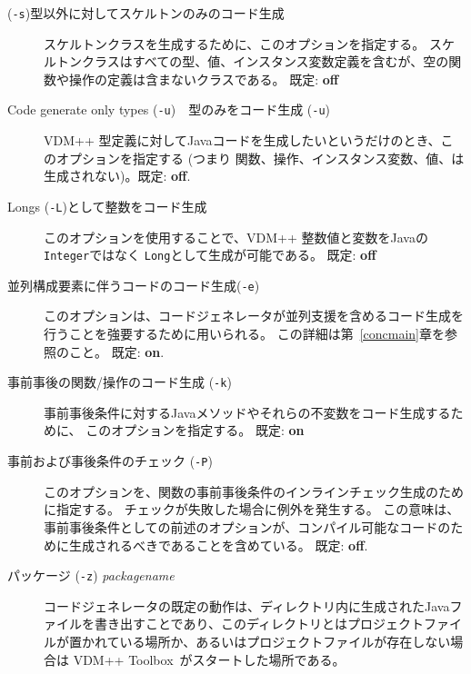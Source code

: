 \documentclass[\pformat,11pt]{jarticle}
\newcommand{\ToolboxName}{VDM++ Toolbox}
\begin{document}
\begin{description}
\item [ ({\tt -s})型以外に対してスケルトンのみのコード生成]
  スケルトンクラスを生成するために、このオプションを指定する。
スケルトンクラスはすべての型、値、インスタンス変数定義を含むが、空の関数や操作の定義は含まないクラスである。
既定: \textbf{off}
\item [Code generate only types ({\tt -u})　型のみをコード生成 ({\tt -u})]
  VDM++ 型定義に対してJavaコードを生成したいというだけのとき、このオプションを指定する (つまり 関数、操作、インスタンス変数、値、は生成されない)。既定: \textbf{off}.%
\item [Longs (\texttt{-L})として整数をコード生成]
  このオプションを使用することで、VDM++ 整数値と変数をJavaの\texttt{Integer}ではなく \texttt{Long}として生成が可能である。
既定: \textbf{off}
\item [並列構成要素に伴うコードのコード生成(\texttt{-e})]
  このオプションは、コードジェネレータが並列支援を含めるコード生成を行うことを強要するために用いられる。
この詳細は第~\ref{concmain}章を参照のこと。
既定: \textbf{on}.
\item [事前事後の関数/操作のコード生成 (\texttt{-k})]
事前事後条件に対するJavaメソッドやそれらの不変数をコード生成するために、 このオプションを指定する。
既定: \textbf{on}%
\item [事前および事後条件のチェック (\texttt{-P})]
 このオプションを、関数の事前事後条件のインラインチェック生成のために指定する。
チェックが失敗した場合に例外を発生する。
この意味は、事前事後条件としての前述のオプションが、コンパイル可能なコードのために生成されるべきであることを含めている。
既定: \textbf{off}.%
\item [パッケージ (\texttt{-z}) \textit{packagename}]
  コードジェネレータの既定の動作は、ディレクトリ内に生成されたJavaファイルを書き出すことであり、このディレクトリとはプロジェクトファイルが置かれている場所か、あるいはプロジェクトファイルが存在しない場合は \ToolboxName\ がスタートした場所である。

\end{description}
\end{document}
